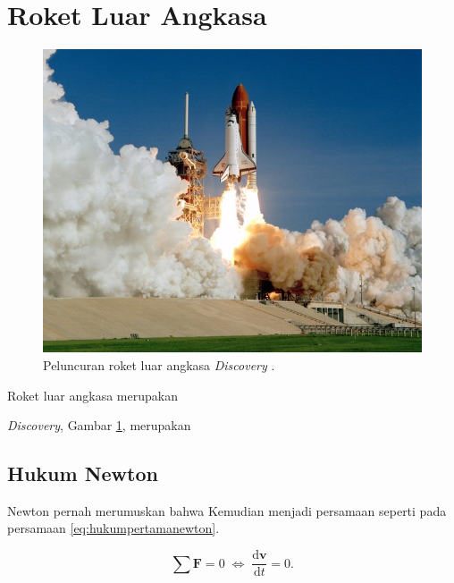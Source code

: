 \section{Roket Luar Angkasa}
\label{sec:roketluarangkasa}

\begin{figure}[H]
  \centering

  \includegraphics[scale=0.35]{gambar/roketluarangkasa.jpg}

  \caption{Peluncuran roket luar angkasa \emph{Discovery} \parencite{roketluarangkasa}.}
  \label{fig:roketluarangkasa}
\end{figure}

Roket luar angkasa merupakan \lipsum[1]

\emph{Discovery}, Gambar \ref{fig:roketluarangkasa}, merupakan \lipsum[2]

\subsection{Hukum Newton}
\label{subsec:hukumnewton}

Newton \parencite{newton1687} pernah merumuskan bahwa \lipsum[1]
Kemudian menjadi persamaan seperti pada persamaan \ref{eq:hukumpertamanewton}.

\begin{equation}
  \label{eq:hukumpertamanewton}
  \sum \mathbf{F} = 0\; \Leftrightarrow\; \frac{\mathrm{d} \mathbf{v} }{\mathrm{d}t} = 0.
\end{equation}

